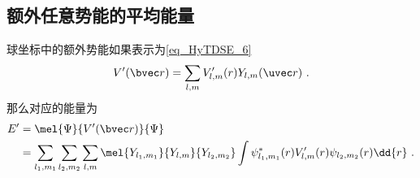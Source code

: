 \subsection{额外任意势能的平均能量}
球坐标中的额外势能如果表示为\autoref{eq_HyTDSE_6}~
\begin{equation}
V'(\bvec r) = \sum_{l,m} V'_{l,m}(r) Y_{l,m}(\uvec r)~.
\end{equation}
那么对应的能量为
\begin{equation}\label{eq_Hanaly_3}
\begin{aligned}
E' &= \mel{\Psi}{V'(\bvec r)}{\Psi}\\
&= \sum_{l_1,m_1}\sum_{l_2,m_2}\sum_{l,m} \mel{Y_{l_1,m_1}}{Y_{l,m}}{Y_{l_2,m_2}} \int \psi_{l_1,m_1}^*(r) V'_{l,m}(r) \psi_{l_2,m_2}(r) \dd{r}~.
\end{aligned}
\end{equation}

